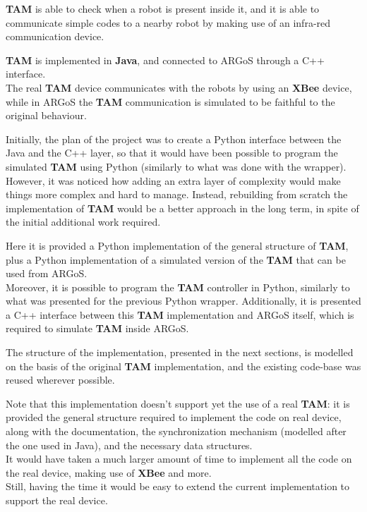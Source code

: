 \documentclass[
12pt,
a4paper,
oneside,
headinclude,
footinclude]{article}
\theoremstyle{definition} %
\begin{document}
\textbf{TAM} is able to check when a robot is present inside it, and it is able to communicate simple codes to a nearby robot by making use of an infra-red communication device.

\textbf{TAM} is implemented in \textbf{Java}, and connected to ARGoS through a C++ interface. \\
The real \textbf{TAM} device communicates with the robots by using an \textbf{XBee} device, while in ARGoS the \textbf{TAM} communication is simulated to be faithful to the original behaviour.

Initially, the plan of the project was to create a Python interface between the Java and the C++ layer, so that it would have been possible to program the simulated \textbf{TAM} using Python (similarly to what was done with the wrapper).\\
However, it was noticed how adding an extra layer of complexity would make things more complex and hard to manage. Instead, rebuilding from scratch the implementation of \textbf{TAM} would be a better approach in the long term, in spite of the initial additional work required.

Here it is provided a Python implementation of the general structure of \textbf{TAM}, plus a Python implementation of a simulated version of the \textbf{TAM} that can be used from ARGoS.\\
Moreover, it is possible to program the \textbf{TAM} controller in Python, similarly to what was presented for the previous Python wrapper.
Additionally, it is presented a C++ interface between this \textbf{TAM} implementation and ARGoS itself, which is required to simulate \textbf{TAM} inside ARGoS.

The structure of the implementation, presented in the next sections, is modelled on the basis of the original \textbf{TAM} implementation, and the existing code-base was reused wherever possible.

Note that this implementation doesn't support yet the use of a real \textbf{TAM}: it is provided the general structure required to implement the code on real device, along with the documentation, the synchronization mechanism (modelled after the one used in Java), and the necessary data structures.\\
It would have taken a much larger amount of time to implement all the code on the real device, making use of \textbf{XBee} and more.\\
Still, having the time it would be easy to extend the current implementation to support the real device.
\end{document}

